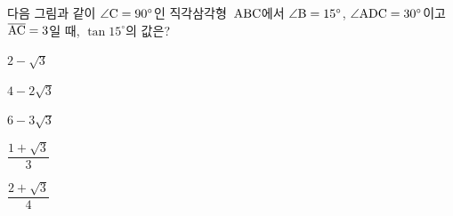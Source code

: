 다음 그림과 같이 $\angle\mathrm{C}=90^\circ$인 직각삼각형~$\mathrm{ABC}$에서 $\angle\mathrm{B}=15^\circ$, $\angle\mathrm{ADC}=30^\circ$이고 $\overline{\mathrm{AC}}=3$일 때, $\tan 15^\circ$의 값은?
\par\smallskip\begin{center}\resizebox{\ifdim\width>\linewidth\linewidth\else\width\fi}{!}{}\end{center}
\begin{choices32}{\rule[-3ex]{0pt}{8ex}$2-\sqrt{3}$}{\rule[-3ex]{0pt}{8ex}$4-2\sqrt{3}$}{\rule[-3ex]{0pt}{8ex}$6-3\sqrt{3}$}{\rule[-3ex]{0pt}{8ex}$\dfrac{1+\sqrt{3}}{3}$}{\rule[-3ex]{0pt}{8ex}$\dfrac{2+\sqrt{3}}{4}$}\end{choices32}
